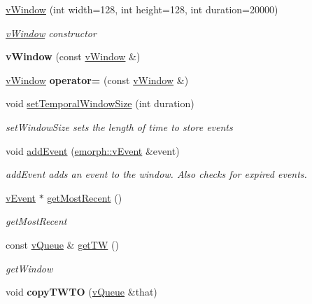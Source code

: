\begin{DoxyCompactItemize}
\item 
\hyperlink{classemorph_1_1vWindow_ae7e0ebcfb7ca683596a967246d609650}{v\-Window} (int width=128, int height=128, int duration=20000)
\begin{DoxyCompactList}\small\item\em \hyperlink{classemorph_1_1vWindow}{v\-Window} constructor \end{DoxyCompactList}\item 
\hypertarget{classemorph_1_1vWindow_a6f79791c8d68c07c73d0e8239be1e51e}{{\bfseries v\-Window} (const \hyperlink{classemorph_1_1vWindow}{v\-Window} \&)}\label{classemorph_1_1vWindow_a6f79791c8d68c07c73d0e8239be1e51e}

\item 
\hypertarget{classemorph_1_1vWindow_ae1cc66633b2fe2e8af91669a26e679d8}{\hyperlink{classemorph_1_1vWindow}{v\-Window} {\bfseries operator=} (const \hyperlink{classemorph_1_1vWindow}{v\-Window} \&)}\label{classemorph_1_1vWindow_ae1cc66633b2fe2e8af91669a26e679d8}

\item 
void \hyperlink{classemorph_1_1vWindow_aedf610895d1ed7d606e5ab403436f200}{set\-Temporal\-Window\-Size} (int duration)
\begin{DoxyCompactList}\small\item\em set\-Window\-Size sets the length of time to store events \end{DoxyCompactList}\item 
void \hyperlink{classemorph_1_1vWindow_ab64b89bf88b7f5460bcea85a0fe31e1c}{add\-Event} (\hyperlink{classemorph_1_1vEvent}{emorph\-::v\-Event} \&event)
\begin{DoxyCompactList}\small\item\em add\-Event adds an event to the window. Also checks for expired events. \end{DoxyCompactList}\item 
\hyperlink{classemorph_1_1vEvent}{v\-Event} $\ast$ \hyperlink{classemorph_1_1vWindow_a20c61b89d6ef1acad4e6c6d7bac89a5b}{get\-Most\-Recent} ()
\begin{DoxyCompactList}\small\item\em get\-Most\-Recent \end{DoxyCompactList}\item 
const \hyperlink{classemorph_1_1vQueue}{v\-Queue} \& \hyperlink{classemorph_1_1vWindow_a0866119cfd77cba8e5b62e0d7a4af195}{get\-T\-W} ()
\begin{DoxyCompactList}\small\item\em get\-Window \end{DoxyCompactList}\item 
\hypertarget{classemorph_1_1vWindow_a3b68c6c2fb8b1b5988b52f8703dff171}{void {\bfseries copy\-T\-W\-T\-O} (\hyperlink{classemorph_1_1vQueue}{v\-Queue} \&that)}\label{classemorph_1_1vWindow_a3b68c6c2fb8b1b5988b52f8703dff171}


\end{DoxyCompactItemize}
